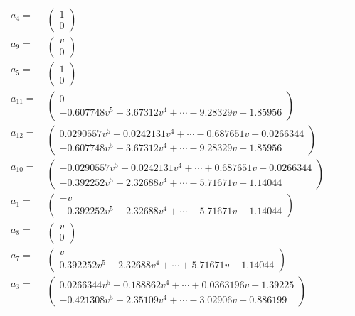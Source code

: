 \documentclass[1p]{elsarticle_modified}
\theoremstyle{definition}
\begin{document}
\begin{tabular}{m{7pt} m{180pt} m{7pt} m{180pt} }
\flushright $a_{4}=$&$\begin{pmatrix}1\\0\end{pmatrix}$ \\
\flushright $a_{9}=$&$\begin{pmatrix}v\\0\end{pmatrix}$ \\
\flushright $a_{5}=$&$\begin{pmatrix}1\\0\end{pmatrix}$ \\
\flushright $a_{11}=$&$\begin{pmatrix}0\\-0.607748 v^{5}-3.67312 v^{4}+\cdots-9.28329 v-1.85956\end{pmatrix}$ \\
\flushright $a_{12}=$&$\begin{pmatrix}0.0290557 v^{5}+0.0242131 v^{4}+\cdots-0.687651 v-0.0266344\\-0.607748 v^{5}-3.67312 v^{4}+\cdots-9.28329 v-1.85956\end{pmatrix}$ \\
\flushright $a_{10}=$&$\begin{pmatrix}-0.0290557 v^{5}-0.0242131 v^{4}+\cdots+0.687651 v+0.0266344\\-0.392252 v^{5}-2.32688 v^{4}+\cdots-5.71671 v-1.14044\end{pmatrix}$ \\
\flushright $a_{1}=$&$\begin{pmatrix}- v\\-0.392252 v^{5}-2.32688 v^{4}+\cdots-5.71671 v-1.14044\end{pmatrix}$ \\
\flushright $a_{8}=$&$\begin{pmatrix}v\\0\end{pmatrix}$ \\
\flushright $a_{7}=$&$\begin{pmatrix}v\\0.392252 v^{5}+2.32688 v^{4}+\cdots+5.71671 v+1.14044\end{pmatrix}$ \\
\flushright $a_{3}=$&$\begin{pmatrix}0.0266344 v^{5}+0.188862 v^{4}+\cdots+0.0363196 v+1.39225\\-0.421308 v^{5}-2.35109 v^{4}+\cdots-3.02906 v+0.886199\end{pmatrix}$ \\

\end{tabular}
\end{document}
